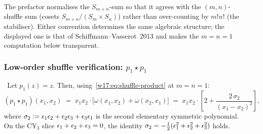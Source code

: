 \begin{remark}
\label{w17:rem:prefactor}
The prefactor normalises the $S_{m+n}$-sum so that it agrees with the
$(m, n)$-shuffle sum (cosets $S_{m+n}/(S_m \times S_n)$) rather than over-counting
by $m!n!$ (the stabiliser). Either convention determines the same algebraic
structure; the displayed one is that of Schiffmann--Vasserot~2013 and makes the
$m = n = 1$ computation below transparent.
\end{remark}

\subsubsection{Low-order shuffle verification: $p_1 \star p_1$}
\label{w17:subsubsec:p1-star-p1}

\begin{proposition}[Level $m = n = 1$ shuffle product]
\label{w17:prop:p1-star-p1}
\ClaimStatusDerivation\
Let $p_1(z) = z$. Then, using~\eqref{w17:eq:shuffle-product}
at $m = n = 1$:
\begin{equation}
\label{w17:eq:p1-star-p1}
 (p_1 \star p_1)(x_1, x_2) \;=\; x_1 x_2 \cdot
 \bigl[\omega(x_1, x_2) + \omega(x_2, x_1)\bigr]
 \;=\; x_1 x_2 \cdot \left[2 + \frac{2\,\sigma_2}{(x_1 - x_2)^2}\right],
\end{equation}
where $\sigma_2 := \epsilon_1 \epsilon_2 + \epsilon_2 \epsilon_3 + \epsilon_3 \epsilon_1$ is the second
elementary symmetric polynomial. On the CY$_3$ slice
$\epsilon_1 + \epsilon_2 + \epsilon_3 = 0$, the identity
$\sigma_2 = -\tfrac{1}{2}(\epsilon_1^2 + \epsilon_2^2 + \epsilon_3^2)$ holds.
\end{proposition}

